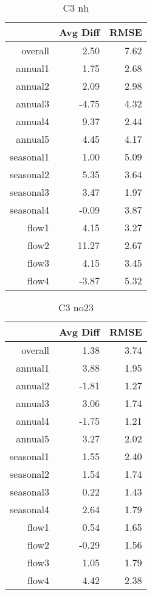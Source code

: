 \begin{table}[H]
\centering
\begin{tabular}{rrr}
  \hline
 & Avg Diff & RMSE \\ 
  \hline
overall & 2.50 & 7.62 \\ 
  annual1 & 1.75 & 2.68 \\ 
  annual2 & 2.09 & 2.98 \\ 
  annual3 & -4.75 & 4.32 \\ 
  annual4 & 9.37 & 2.44 \\ 
  annual5 & 4.45 & 4.17 \\ 
  seasonal1 & 1.00 & 5.09 \\ 
  seasonal2 & 5.35 & 3.64 \\ 
  seasonal3 & 3.47 & 1.97 \\ 
  seasonal4 & -0.09 & 3.87 \\ 
  flow1 & 4.15 & 3.27 \\ 
  flow2 & 11.27 & 2.67 \\ 
  flow3 & 4.15 & 3.45 \\ 
  flow4 & -3.87 & 5.32 \\ 
   \hline
\end{tabular}
\caption{C3 nh} 
\end{table}
\begin{table}[H]
\centering
\begin{tabular}{rrr}
  \hline
 & Avg Diff & RMSE \\ 
  \hline
overall & 1.38 & 3.74 \\ 
  annual1 & 3.88 & 1.95 \\ 
  annual2 & -1.81 & 1.27 \\ 
  annual3 & 3.06 & 1.74 \\ 
  annual4 & -1.75 & 1.21 \\ 
  annual5 & 3.27 & 2.02 \\ 
  seasonal1 & 1.55 & 2.40 \\ 
  seasonal2 & 1.54 & 1.74 \\ 
  seasonal3 & 0.22 & 1.43 \\ 
  seasonal4 & 2.64 & 1.79 \\ 
  flow1 & 0.54 & 1.65 \\ 
  flow2 & -0.29 & 1.56 \\ 
  flow3 & 1.05 & 1.79 \\ 
  flow4 & 4.42 & 2.38 \\ 
   \hline
\end{tabular}
\caption{C3 no23} 
\end{table}

